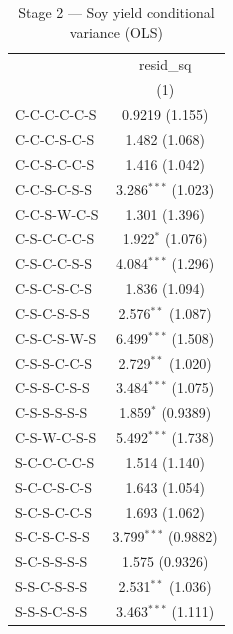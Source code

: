 
\begin{table}[H]
   \caption{\label{tab:soy_jp_var} Stage 2 — Soy yield conditional variance (OLS)}
   \bigskip
   \centering
   \begin{tabular}{lc}
      \toprule
                                      & resid\_sq\\   
                                      & (1)\\  
      \midrule 
      C-C-C-C-C-S                     & 0.9219 (1.155)\\   
      C-C-C-S-C-S                     & 1.482 (1.068)\\   
      C-C-S-C-C-S                     & 1.416 (1.042)\\   
      C-C-S-C-S-S                     & 3.286$^{***}$ (1.023)\\   
      C-C-S-W-C-S                     & 1.301 (1.396)\\   
      C-S-C-C-C-S                     & 1.922$^{*}$ (1.076)\\   
      C-S-C-C-S-S                     & 4.084$^{***}$ (1.296)\\   
      C-S-C-S-C-S                     & 1.836 (1.094)\\   
      C-S-C-S-S-S                     & 2.576$^{**}$ (1.087)\\   
      C-S-C-S-W-S                     & 6.499$^{***}$ (1.508)\\   
      C-S-S-C-C-S                     & 2.729$^{**}$ (1.020)\\   
      C-S-S-C-S-S                     & 3.484$^{***}$ (1.075)\\   
      C-S-S-S-S-S                     & 1.859$^{*}$ (0.9389)\\   
      C-S-W-C-S-S                     & 5.492$^{***}$ (1.738)\\   
      S-C-C-C-C-S                     & 1.514 (1.140)\\   
      S-C-C-S-C-S                     & 1.643 (1.054)\\   
      S-C-S-C-C-S                     & 1.693 (1.062)\\   
      S-C-S-C-S-S                     & 3.799$^{***}$ (0.9882)\\   
      S-C-S-S-S-S                     & 1.575 (0.9326)\\   
      S-S-C-S-S-S                     & 2.531$^{**}$ (1.036)\\   
      S-S-S-C-S-S                     & 3.463$^{***}$ (1.111)\\   

\end{tabular}
\end{table}
